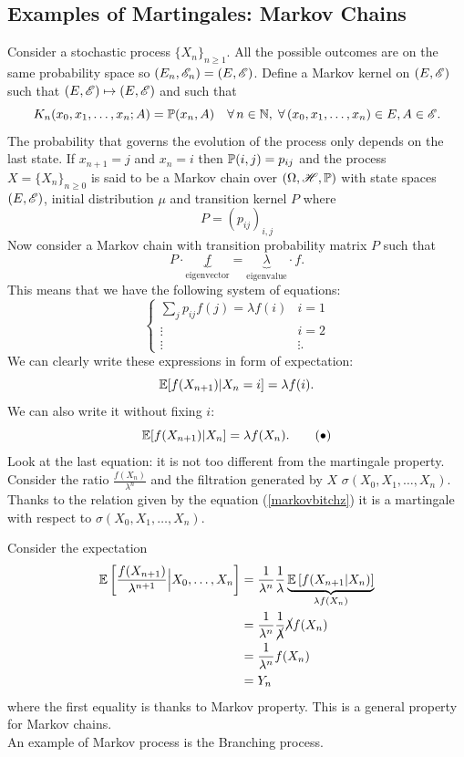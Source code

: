 \documentclass{report}
\begin{document}
\subsection{Examples of Martingales: Markov Chains}
Consider a stochastic process ${\{X_{n}\}}_{n\geq 1}$. All the possible outcomes are on the same probability space so $(E_{n},\mathscr{E}_{n})=(E,\mathscr{E})$. Define a Markov kernel on $(E,\mathscr{E})$ such that $(E,\mathscr{E})\mapsto(E,\mathscr{E})$ and such that
\begin{equation*}
	K_{n}(x_{0},x_{1},\ldots,x_{n};A)=\mathbb{P}(x_{n},A)\quad\forall\, n\in\mathbb{N},\;\forall\,(x_0,x_1,\ldots,x_n)\in E,A\in\mathscr{E}.
\end{equation*}
The probability that governs the evolution of the process only depends on the last state. If $x_{n+1}=j$ and $x_{n}=i$ then $\mathbb{P}(i,j)=p_{ij}$ and the process $X={\{X_{n}\}}_{n\geq0}$ is said to be a Markov chain over $(\Omega,\mathscr{H},\mathbb{P})$ with state spaces $(E,\mathscr{E})$, initial distribution $\mu$ and transition kernel $P$ where 
\begin{equation*}
	P={(p_{ij})}_{i,j}
\end{equation*}
Now consider a Markov chain with transition probability matrix $P$ such that
\[P\cdot\underbrace{f}_{{\text{eigenvector}}}=\underbrace{\lambda}_{{\text{eigenvalue}}}\cdot f.\]
This means that we have the following system of equations:
\[\begin{cases}
	\sum_{j} p_{ij}f(j)=\lambda f(i)&i=1\\
	\vdots&i=2\\
	\vdots&\vdots.
\end{cases}\]
We can clearly write these expressions in form of expectation:
\[\mathbb{E}[f(X_{n+1})|X_{n}=i]=\lambda f(i).\]
We can also write it without fixing $i$:
\begin{equation}
	\mathbb{E}[f(X_{n+1})|X_{n}]=\lambda f(X_{n}).\tag{$\bullet$}\label{markovbitchz}
\end{equation}
Look at the last equation: it is not too different from the martingale property. Consider the ratio $\frac{f(X_{n})}{\lambda^{n}}$ and the filtration generated by $X$ $\sigma(X_{0},X_{1},\ldots,X_{n})$. Thanks to the relation given by the equation (\ref{markovbitchz}) it is a martingale with respect to $\sigma(X_{0},X_{1},\ldots,X_{n})$.
\begin{fancyproof}
	Consider the expectation 
	\begin{align*}
		\mathbb{E}\left[\frac{f(X_{n+1})}{\lambda^{n+1}}\Big|X_0,\ldots,X_n\right]&=\frac{1}{\lambda^{n}}\frac{1}{\lambda}\underbrace{\mathbb{E}\left[f(X_{n+1}|X_{n})\right]}_{\lambda f(X_{n})}\\
		&=\frac{1}{\lambda^{n}}\frac{1}{\cancel{\lambda}}\cancel{\lambda}f(X_{n})\\
		&=\frac{1}{\lambda^{n}}f(X_{n})\\
		&=Y_{n}
	\end{align*}
	where the first equality is thanks to Markov property. This is a general property for Markov chains.\\
	An example of Markov process is the Branching process. 
\end{fancyproof}
\end{document}
